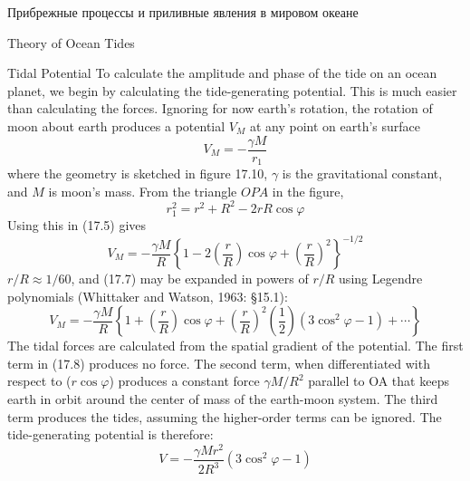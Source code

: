 \begin{chapter}{Прибрежные процессы и приливные явления в мировом океане}
\begin{section}{Theory of Ocean Tides}
\begin{paragraph}{Tidal Potential}
To calculate the amplitude and phase of the tide on an ocean planet,
we begin by calculating the tide-generating
potential. This is much easier than calculating
the forces. Ignoring for now earth's rotation, the rotation of
moon about earth produces a potential $V_M$ at any point
on earth's surface
\begin{equation}
V_{M} = -\frac{\gamma M}{r_{1}}
\end{equation}
where the geometry is sketched in figure 17.10, $\gamma $ is the
gravitational constant, and $M$ is moon's mass. From the triangle
$OPA$ in the figure,
\begin{equation}
r_{1}^{2} = r^{2} + R^{2} - 2 r R \cos \varphi
\end{equation}
Using this in (17.5) gives
\begin{equation}
V_{M} = -\frac{\gamma M}{R} \left\{ 1 - 2 \left(\frac{r}{R}\right) \cos \varphi +
\left(\frac{r}{R}\right)^{2}\right\}^{-1/2}
\end{equation}
$r/R \approx 1/60$, and (17.7) may be expanded in powers of $r/R$
using Legendre polynomials (Whittaker and Watson, 1963: \S 15.1):
\begin{equation}
V_M = -\frac{\gamma M}{R} \left\{1+\left(\frac{r}{R}\right) \cos \varphi +
\left(\frac{r}{R}\right)^2 \left(\frac{1}{2}\right) (3\cos ^2 \varphi - 1) + \cdots
\right\}
\end{equation}
The tidal forces are calculated from the spatial gradient of the
potential. The first term in (17.8) produces no force. The second
term, when differentiated with respect to ($r \cos \varphi $) produces
a constant force $\gamma M/R^{2}$ parallel to OA that keeps earth in
orbit around the center of mass of the earth-moon system. The third
term produces the tides, assuming the higher-order terms can be
ignored. The tide-generating potential is therefore:
\begin{equation}
V= -\frac{\gamma M r^{2}}{2 R^{3}} (3 \cos ^2 \varphi - 1)
\end{equation}
%

\end{paragraph}
\end{section}
\end{chapter}
